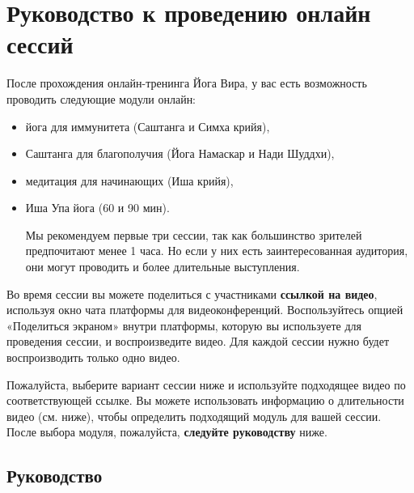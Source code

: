 \newpage
\section*{Руководство к проведению онлайн сессий}
\label{sec:online}

После прохождения онлайн-тренинга Йога Вира, у вас есть возможность проводить следующие модули онлайн:  %
\begin{itemize}
\item йога для иммунитета (Саштанга и Симха крийя),
\item Саштанга для благополучия (Йога Намаскар и Нади Шуддхи),
\item медитация для начинающих (Иша крийя),
\item Иша Упа йога (60 и 90 мин).

    Мы рекомендуем первые три сессии, так как большинство зрителей предпочитают менее 1 часа. Но если у них есть заинтересованная аудитория, они могут проводить и более длительные выступления.
\end{itemize}

Во время сессии вы можете поделиться с участниками \textbf{ссылкой на видео}, используя окно чата платформы для видеоконференций. Воспользуйтесь опцией
«Поделиться экраном» внутри платформы, которую вы используете для
проведения сессии, и воспроизведите видео.
Для каждой сессии нужно будет воспроизводить только одно видео.

Пожалуйста, выберите вариант сессии ниже и используйте подходящее видео по соответствующей ссылке. Вы можете использовать информацию о длительности видео (см. ниже), чтобы определить подходящий модуль для вашей сессии.
После выбора модуля, пожалуйста, \textbf{следуйте руководству} ниже.

\subsection*{Руководство}
\label{sec:list}

